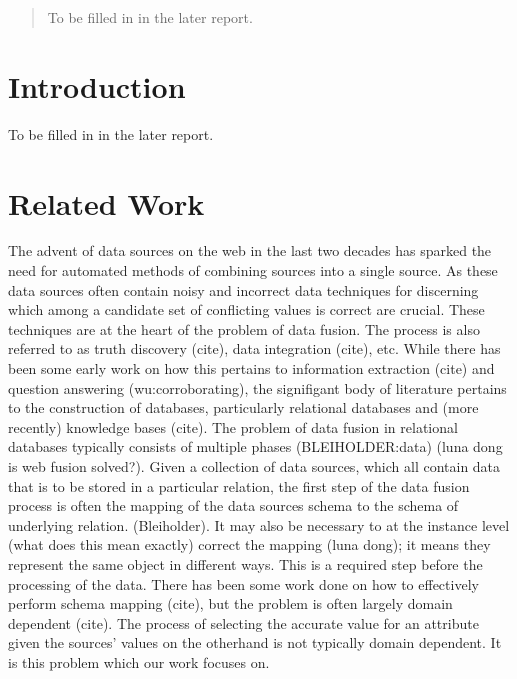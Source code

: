\documentclass{acm_proc_article-sp}
\begin{document}
\maketitle
\begin{abstract}
To be filled in in the later report. 
\end{abstract}




\section{Introduction}
To be filled in in the later report.


\section{Related Work}
The advent of data sources on the web in the last two decades has sparked the need for automated methods of combining sources into a single source. As these data sources often contain noisy and incorrect data techniques for discerning which among a candidate set of conflicting values is correct are crucial. These techniques are at the heart of the problem of data fusion. The process is also referred to as truth discovery (cite), data integration (cite), etc. While there has been some early work on how this pertains to information extraction (cite) and question answering (wu:corroborating), the signifigant body of literature pertains to the construction of databases, particularly relational databases and (more recently) knowledge bases (cite). The problem of data fusion in relational databases typically consists of multiple phases (BLEIHOLDER:data) (luna dong is web fusion solved?). Given a collection of data sources, which all contain data that is to be stored in a particular relation, the first step of the data fusion process is often the mapping of the data sources schema to the schema of underlying relation. (Bleiholder). It may also be necessary to at the instance level (what does this mean exactly) correct the mapping (luna dong); it means they represent the same object in different ways. This is a required step before the processing of the data. There has been some work done on how to effectively perform schema mapping (cite), but the problem is often largely domain dependent (cite). The process of selecting the accurate value for an attribute given the sources' values on the otherhand is not typically domain dependent. It is this problem which our work focuses on.
\end{document}
